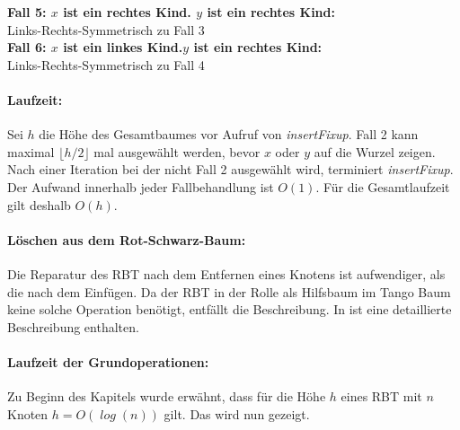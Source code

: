\documentclass[a4paper,12pt]{article}
\begin{document}
\noindent\textbf{Fall 5: $x$ ist ein rechtes Kind. $y$ ist ein rechtes Kind: }\\ 
Links-Rechts-Symmetrisch zu Fall 3\\
\noindent\textbf{Fall 6:  $x$ ist ein linkes Kind.$y$ ist ein rechtes Kind: }\\ 
Links-Rechts-Symmetrisch zu Fall 4\\


\paragraph{Laufzeit:}
\noindent  Sei $h$ die Höhe des Gesamtbaumes vor Aufruf von \textit{insertFixup}. Fall 2 kann maximal $\lfloor h / 2\rfloor$ mal ausgewählt werden, bevor $x$ oder $y$ auf die Wurzel zeigen. Nach einer Iteration bei der nicht Fall 2 ausgewählt wird, terminiert \textit{insertFixup}. Der Aufwand innerhalb jeder Fallbehandlung ist $O(1)$. Für die Gesamtlaufzeit gilt deshalb $\mathit{O(h)}$.


  
\paragraph{Löschen aus dem Rot-Schwarz-Baum:}
Die Reparatur des RBT nach dem Entfernen eines Knotens ist aufwendiger, als die nach dem Einfügen. Da der RBT in der Rolle als Hilfsbaum im Tango Baum keine solche Operation benötigt, entfällt die Beschreibung. In \cite{algEinf} ist eine detaillierte Beschreibung enthalten. 
\paragraph{Laufzeit der Grundoperationen:}
Zu Beginn des Kapitels wurde erwähnt, dass für die Höhe $h$ eines RBT mit $n$ Knoten $h = \mathit{O(\log {\left(n\right)})}$  gilt. Das wird nun gezeigt. 
\end{document}
